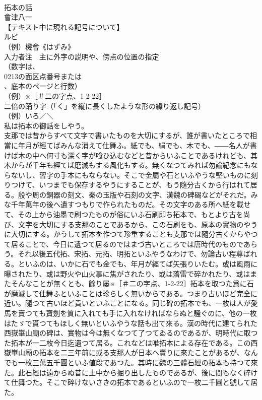 \documentclass[8pt]{extreport}
\begin{document}
\begin{CJK}{UTF8}{min}
\\	拓本の話
\\	會津八一
\\	【テキスト中に現れる記号について】
\\	ルビ
\\	（例）機會《はずみ》
\\	入力者注　主に外字の説明や、傍点の位置の指定
\\	（数字は、
\\	0213の面区点番号または
\\	、底本のページと行数）
\\	（例）※［＃二の字点、1-2-22］
\\	二倍の踊り字（「く」を縦に長くしたような形の繰り返し記号）
\\	（例）いろ／＼
\\	私は拓本の御話をしやう。
\\	支那では昔からすべて文字で書いたものを大切にするが、誰が書いたところで相當に年月が經てばみんな消えて仕舞ふ。紙でも、絹でも、木でも、――名人が書けば木の中へ何寸も深く字が喰ひ込むなどと昔からいふことであるけれども、其木からが千年も經てば磨滅もする風化もする。無くなつてみれば勿論紀念にもならないし、習字の手本にもならない。そこで金屬や石といふやうな堅いものに刻りつけて、いつまでも保存するやうにすることが、もう隨分古くから行はれて居る。殷や周の銅器の刻文、秦の玉版や石刻の文字、漢魏の碑碣などがそれだ。みな千年萬年の後へ遺すつもりで作られたものだ。その文字のある所へ紙を載せて、その上から油墨で刷つたものが俗にいふ石刷即ち拓本で、もとより古を尚び、文字を大切にする支那のことであるから、この石刷をも、原本の實物のやうに大切にする。かうして拓本を作つて珍重することも支那では隨分古くからやつて居ることで、今日に遺つて居るのではまづ古いところでは唐時代のものであらう。それ以後五代拓、宋拓、元拓、明拓といふやうなわけで、勿論古い程尊ばれる。といふのは、いかに石でも金でも、年月が經てば矢張りいたむ。或は風雨に曝されたり、或は野火や山火事に焦がされたり、或は落雷で碎かれたり、或はまたそんなことが無くとも、餘り屡※［＃二の字点、1-2-22］拓本を取つた爲に石が磨滅して仕舞ふといふことは珍らしく無いからである。つまり古いほど完全に近い。隨つて古いほど貴いといふことになる。同じ碑の拓本でも、一枚は人が愛馬を賣つても寶劍を質に入れても手に入れなければならぬと騒ぐのに、他の一枚はたゞで貰つてもほしく無いといふやうな話も出て來る。漢の時代に建てられた西嶽崋山廟の碑は、實物は今は無くなつて了つてゐるのであるが、明時代に取つた拓本が一二枚今日迄遺つて居る。これなどは唯拓本による存在である。この西嶽崋山廟の拓本を二三年前に或る支那人が日本へ賣りに來たことがあるが、なんでも一枚三萬五千圓といふ値段であつた。其時に魏の三體石經の拓本も持つて來た。此石經は遠からぬ昔に土中から掘り出したものであるが、後に間もなく碎けて仕舞つた。そこで碎けないさきの拓本であるといふので一枚二千圓と號して居た。

\end{CJK}
\end{document}
